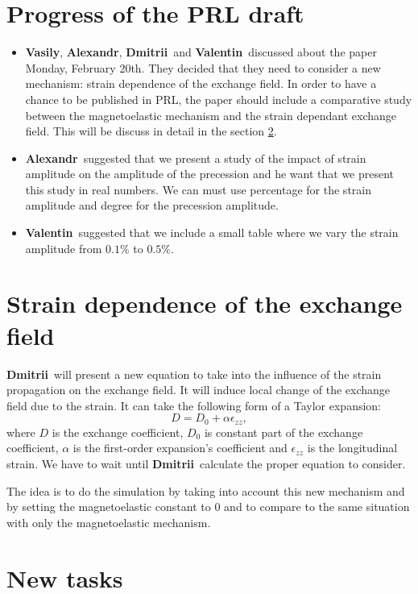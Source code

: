 \documentclass[12pt,a4paper]{article}
\newcommand{\valentin}{\textbf{Valentin}}
\newcommand{\alexandr}{\textbf{Alexandr}}
\newcommand{\vasily}{\textbf{Vasily}}
\newcommand{\dmitrii}{\textbf{Dmitrii}}
\begin{document}
\section{Progress of the PRL draft}
\label{sec3}
\begin{itemize}
    \item \vasily, \alexandr, \dmitrii\ and \valentin\ discussed about the paper Monday, February 20th.
    They decided that they need to consider a new mechanism: strain dependence of the exchange field.
    In order to have a chance to be published in PRL, the paper should include a comparative study between the magnetoelastic mechanism and the strain dependant exchange field.
    This will be discuss in detail in the section \ref{sec4}.
    \item \alexandr\ suggested that we present a study of the impact of strain amplitude on the amplitude of the precession and he want that we present this study in real numbers.
    We can must use percentage for the strain amplitude and degree for the precession amplitude.
    \item \valentin\ suggested that we include a small table where we vary the strain amplitude from $0.1\%$ to $0.5\%$.
\end{itemize}

\section{Strain dependence of the exchange field}
\label{sec4}
\dmitrii\ will present a new equation to take into the influence of the strain propagation on the exchange field.
It will induce local change of the exchange field due to the strain.
It can take the following form of a Taylor expansion:
\begin{equation}
    D = D_0 + \alpha \epsilon_{zz},
    \label{eq1}    
\end{equation}
where $D$ is the exchange coefficient, $D_0$ is constant part of the exchange coefficient, $\alpha$ is the first-order expansion's coefficient and $\epsilon_{zz}$ is the longitudinal strain.
We have to wait until \dmitrii\ calculate the proper equation to consider.

The idea is to do the simulation by taking into account this new mechanism and by setting the magnetoelastic constant to $0$ and to compare to the same situation with only the magnetoelastic mechanism.

\section{New tasks}
\end{document}
